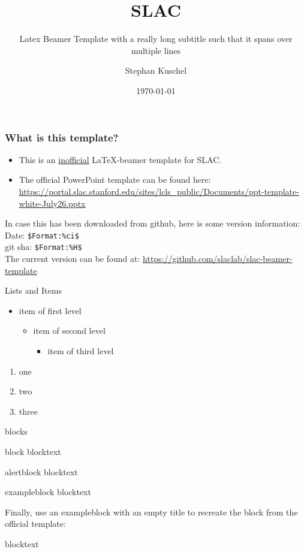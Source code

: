 \documentclass{beamer}
\title{SLAC}
\subtitle{Latex Beamer Template with a really long subtitle such that it spans over multiple lines}
\author{Stephan Kuschel}
\institute{SLAC National Accelerator Laboratory}
\date{\today}
\begin{document}
\frame{\titlepage}


\begin{frame}[fragile]
\frametitle{What is this template?}
\begin{itemize}
\item This is an \underline{inofficial} \LaTeX-beamer template for SLAC.
\item The official PowerPoint template can be found here: \\
\url{https://portal.slac.stanford.edu/sites/lcls_public/Documents/ppt-template-white-July26.pptx}
\end{itemize}
In case this has been downloaded from github, here is some version information: \\
Date: \verb|$Format:%ci$| \\
git sha: \verb|$Format:%H$| \\[1em]
The current version can be found at:
\url{https://github.com/slaclab/slac-beamer-template}
\end{frame}


\begin{frame}{Lists and Items}
  \begin{itemize}
    \item item of first level
    \begin{itemize}
      \item item of second level
      \begin{itemize}
        \item item of third level
      \end{itemize}
    \end{itemize}
  \end{itemize}
  \begin{enumerate}
    \item one
    \item two
    \item three
  \end{enumerate}
\end{frame}

\begin{frame}{blocks}
\begin{block}{block}
  blocktext
\end{block}

\begin{alertblock}{alertblock}
  blocktext
\end{alertblock}

\begin{exampleblock}{exampleblock}
  blocktext
\end{exampleblock}

Finally, use an exampleblock with an empty title to recreate the block from the official template:
\begin{exampleblock}{}
  blocktext
\end{exampleblock}
\end{frame}
\end{document}
